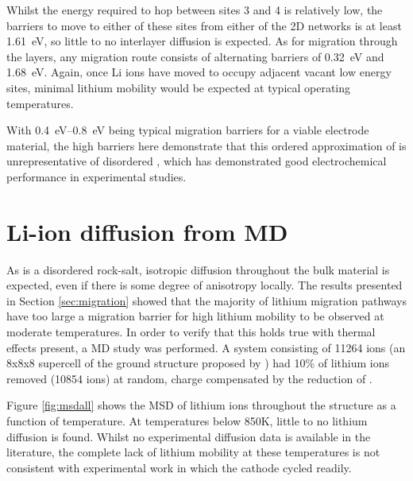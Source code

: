 Whilst the energy required to hop between sites 3 and 4 is relatively low, the barriers to move to either of these sites from either of the 2D networks is at least \SI{1.61}{\electronvolt}, so little to no interlayer diffusion is expected.
As for migration through the layers, any migration route consists of alternating barriers of \SI{0.32}{\electronvolt} and \SI{1.68}{\electronvolt}.
Again, once Li ions have moved to occupy adjacent vacant low energy sites, minimal lithium mobility would be expected at typical operating temperatures.

With \SIrange{0.4}{0.8}{\electronvolt} being typical migration barriers for a viable electrode material, the high barriers here demonstrate that this ordered approximation of  is unrepresentative of disordered , which has demonstrated good electrochemical performance in experimental studies.\cite{Freire2016}


\section{Li-ion diffusion from MD}
As  is a disordered rock-salt, isotropic diffusion throughout the bulk material is expected, even if there is some degree of anisotropy locally.
The results presented in Section \ref{sec:migration} showed that the majority of lithium migration pathways have too large a migration barrier for high lithium mobility to be observed at moderate temperatures.
In order to verify that this holds true with thermal effects present, a MD study was performed.
A system consisting of 11264 ions (an 8x8x8 supercell of the ground structure proposed by \citet{Diaz-Lopez2017}) had 10\% of lithium ions removed (10854 ions) at random, charge compensated by the reduction of .

Figure \ref{fig:msdall} shows the MSD of lithium ions throughout the structure as a function of temperature.
At temperatures below 850K, little to no lithium diffusion is found.
Whilst no experimental diffusion data is available in the literature, the complete lack of lithium mobility at these temperatures is not consistent with experimental work in which the cathode cycled readily.

